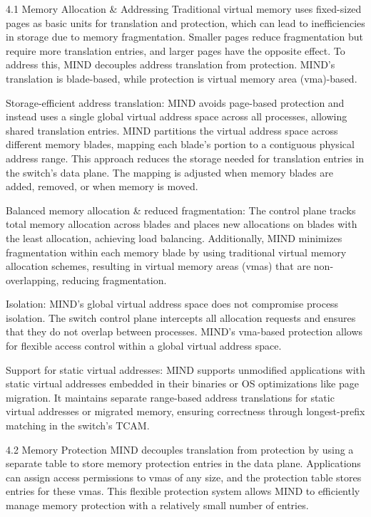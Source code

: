 4.1 Memory Allocation \& Addressing
Traditional virtual memory uses fixed-sized pages as basic units for translation and protection, which can lead to inefficiencies in storage due to memory fragmentation. Smaller pages reduce fragmentation but require more translation entries, and larger pages have the opposite effect. To address this, MIND decouples address translation from protection. MIND's translation is blade-based, while protection is virtual memory area (vma)-based.

Storage-efficient address translation: MIND avoids page-based protection and instead uses a single global virtual address space across all processes, allowing shared translation entries. MIND partitions the virtual address space across different memory blades, mapping each blade’s portion to a contiguous physical address range. This approach reduces the storage needed for translation entries in the switch's data plane. The mapping is adjusted when memory blades are added, removed, or when memory is moved.

Balanced memory allocation \& reduced fragmentation: The control plane tracks total memory allocation across blades and places new allocations on blades with the least allocation, achieving load balancing. Additionally, MIND minimizes fragmentation within each memory blade by using traditional virtual memory allocation schemes, resulting in virtual memory areas (vmas) that are non-overlapping, reducing fragmentation.

Isolation: MIND's global virtual address space does not compromise process isolation. The switch control plane intercepts all allocation requests and ensures that they do not overlap between processes. MIND's vma-based protection allows for flexible access control within a global virtual address space.

Support for static virtual addresses: MIND supports unmodified applications with static virtual addresses embedded in their binaries or OS optimizations like page migration. It maintains separate range-based address translations for static virtual addresses or migrated memory, ensuring correctness through longest-prefix matching in the switch’s TCAM.

4.2 Memory Protection
MIND decouples translation from protection by using a separate table to store memory protection entries in the data plane. Applications can assign access permissions to vmas of any size, and the protection table stores entries for these vmas. This flexible protection system allows MIND to efficiently manage memory protection with a relatively small number of entries.

